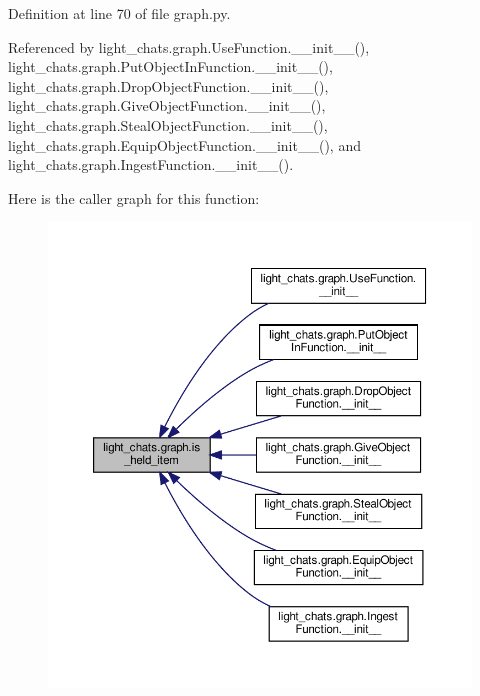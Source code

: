 Definition at line 70 of file graph.\+py.



Referenced by light\+\_\+chats.\+graph.\+Use\+Function.\+\_\+\+\_\+init\+\_\+\+\_\+(), light\+\_\+chats.\+graph.\+Put\+Object\+In\+Function.\+\_\+\+\_\+init\+\_\+\+\_\+(), light\+\_\+chats.\+graph.\+Drop\+Object\+Function.\+\_\+\+\_\+init\+\_\+\+\_\+(), light\+\_\+chats.\+graph.\+Give\+Object\+Function.\+\_\+\+\_\+init\+\_\+\+\_\+(), light\+\_\+chats.\+graph.\+Steal\+Object\+Function.\+\_\+\+\_\+init\+\_\+\+\_\+(), light\+\_\+chats.\+graph.\+Equip\+Object\+Function.\+\_\+\+\_\+init\+\_\+\+\_\+(), and light\+\_\+chats.\+graph.\+Ingest\+Function.\+\_\+\+\_\+init\+\_\+\+\_\+().

Here is the caller graph for this function\+:
\nopagebreak
\begin{figure}[H]
\begin{center}
\leavevmode
\includegraphics[width=350pt]{namespacelight__chats_1_1graph_aa0be6ee7e9f549a7195bea9dfb962ad6_icgraph}
\end{center}
\end{figure}
\mbox{\label{namespacelight__chats_1_1graph_a1e4fb75c70e6fbe0b134e3fe135deeba}} 
